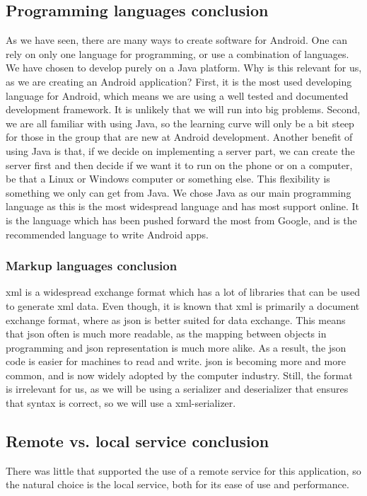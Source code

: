 \subsection{Programming languages conclusion}
As we have seen, there are many ways to create software for Android. One can rely on only one language for programming, or use a combination of languages. We have chosen to develop purely on a Java platform. Why is this relevant for us, as we are creating an Android application?
\newline
\newline
First, it is the most used developing language for Android, which means we are using a well tested and documented development framework. It is unlikely that we will run into big problems. Second, we are all familiar with using Java, so the learning curve will only be a bit steep for those in the group that are new at Android development.  Another benefit of using Java is that, if we decide on implementing a server part, we can create the server first and then decide if we want it to run on the phone or on a computer, be that a Linux or Windows computer or something else. This flexibility is something we only can get from Java.
\newline
\newline
We chose Java as our main programming language as this is the most widespread language and has most support online. It is the language which has been pushed forward the most from Google, and is the recommended language to write Android apps.

\subsubsection{Markup languages conclusion}
\gls{xml} is a widespread exchange format which has a lot of libraries that can be used to generate \gls{xml} data. Even though, it is known that \gls{xml} is primarily a document exchange format, where as \gls{json} is better suited for data exchange. This means that \gls{json} often is much more readable, as the mapping between objects in programming and \gls{json} representation is much more alike. As a result, the \gls{json} code is easier for machines to read and write. \gls{json} is becoming more and more common, and is now widely adopted by the computer industry. Still, the format is irrelevant for us, as we will be using a serializer and deserializer that ensures that syntax is correct, so we will use a \gls{xml}-serializer. 

\subsection{Remote vs. local service conclusion}
There was little that supported the use of a remote service for this application, so the natural choice is the local service, both for its ease of use and performance.

